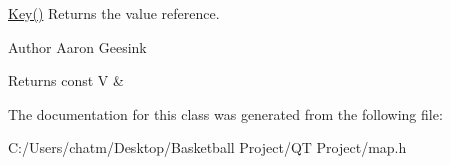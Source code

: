 \mbox{\hyperlink{class_position_a0ba88e33f79d95d77e9761a2b71a1ae9}{Key()}} Returns the value reference. 

\begin{DoxyAuthor}{Author}
Aaron Geesink 
\end{DoxyAuthor}
\begin{DoxyReturn}{Returns}
const V \& 
\end{DoxyReturn}


The documentation for this class was generated from the following file\+:\begin{DoxyCompactItemize}
\item 
C\+:/\+Users/chatm/\+Desktop/\+Basketball Project/\+Q\+T Project/map.\+h\end{DoxyCompactItemize}
